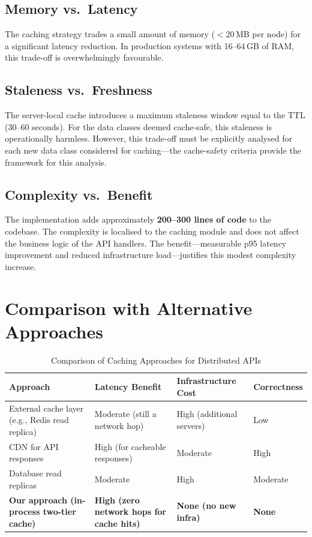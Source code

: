 \documentclass[12pt,a4paper]{report}
\begin{document}
\subsection{Memory vs.\ Latency}

The caching strategy trades a small amount of memory ($<$20\,MB per node) for a significant latency reduction. In production systems with 16–64\,GB of RAM, this trade-off is overwhelmingly favourable.

\subsection{Staleness vs.\ Freshness}

The server-local cache introduces a maximum staleness window equal to the TTL (30–60 seconds). For the data classes deemed cache-safe, this staleness is operationally harmless. However, this trade-off must be explicitly analysed for each new data class considered for caching—the cache-safety criteria provide the framework for this analysis.

\subsection{Complexity vs.\ Benefit}

The implementation adds approximately \textbf{200–300 lines of code} to the codebase. The complexity is localised to the caching module and does not affect the business logic of the API handlers. The benefit—measurable p95 latency improvement and reduced infrastructure load—justifies this modest complexity increase.

\section{Comparison with Alternative Approaches}

\begin{table}[h]
\centering
\begin{tabular}{@{} l p{3cm} p{3cm} p{3.5cm} @{}}
\toprule
\textbf{Approach} & \textbf{Latency Benefit} & \textbf{Infrastructure Cost} & \textbf{Correctness} \\
\midrule
External cache layer (e.g., Redis read replica) & Moderate (still a network hop) & High (additional servers) & Low  \\
CDN for API responses & High (for cacheable responses) & Moderate & High \\
Database read replicas & Moderate & High & Moderate \\
\textbf{Our approach (in-process two-tier cache)} & \textbf{High (zero network hops for cache hits)} & \textbf{None (no new infra)} & \textbf{None} \\
\bottomrule
\end{tabular}
\caption{Comparison of Caching Approaches for Distributed APIs}
\label{tab:approach-comparison}
\end{table}
\end{document}
